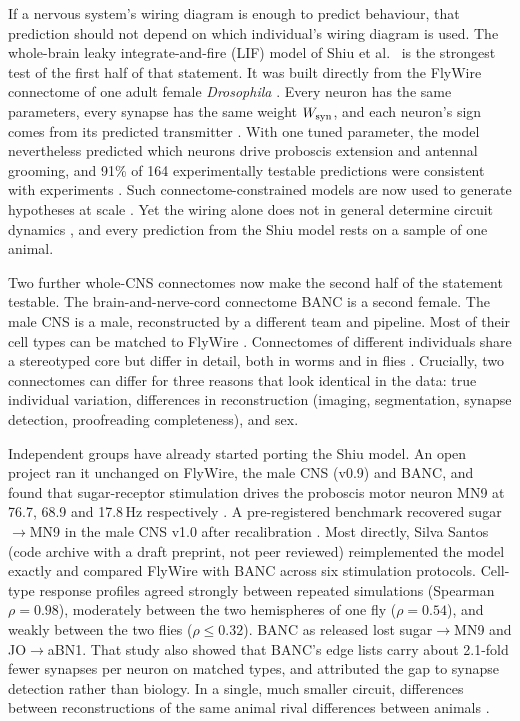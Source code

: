 If a nervous system's wiring diagram is enough to predict behaviour, that prediction should
not depend on which individual's wiring diagram is used. The whole-brain leaky
integrate-and-fire (LIF) model of Shiu et al.\ \citep{shiu2024} is the strongest test of the
first half of that statement. It was built directly from the FlyWire connectome of one adult
female \textit{Drosophila} \citep{dorkenwald2024,schlegel2024}. Every neuron has the same
parameters, every synapse has the same weight $W_{\mathrm{syn}}$, and each neuron's sign comes from its
predicted transmitter \citep{eckstein2024}. With one tuned parameter, the model nevertheless
predicted which neurons drive proboscis extension and antennal grooming, and 91\% of 164
experimentally testable predictions were consistent with experiments \citep{shiu2024}. Such
connectome-constrained models are now used to generate hypotheses at scale
\citep{pospisil2024,lappalainen2024}. Yet the wiring alone does not in general determine
circuit dynamics \citep{bargmann2013,beiran2025}, and every prediction from the Shiu model
rests on a sample of one animal.

Two further whole-CNS connectomes now make the second half of the statement testable. The
brain-and-nerve-cord connectome BANC \citep{bates2026} is a second female. The male CNS
\citep{berg2026} is a male, reconstructed by a different team and pipeline. Most of their
cell types can be matched to FlyWire \citep{schlegel2024,berg2026}. Connectomes of different
individuals share a stereotyped core but differ in detail, both in worms \citep{witvliet2021}
and in flies \citep{schlegel2024,pedigo2023}. Crucially, two connectomes can differ for three
reasons that look identical in the data: true individual variation, differences in
reconstruction (imaging, segmentation, synapse detection, proofreading completeness), and sex.

Independent groups have already started porting the Shiu model. An open project ran it
unchanged on FlyWire, the male CNS (v0.9) and BANC, and found that sugar-receptor stimulation
drives the proboscis motor neuron MN9 at 76.7, 68.9 and 17.8\,Hz respectively
\citep{brainlab2026}. A pre-registered benchmark recovered sugar$\to$MN9 in the male CNS v1.0
after recalibration \citep{fugsukjit2026}. Most directly, Silva Santos \citep{santos2026} (code archive with a draft preprint, not peer reviewed) reimplemented
the model exactly and compared FlyWire with BANC across six stimulation protocols. Cell-type
response profiles agreed strongly between repeated simulations (Spearman $\rho=0.98$),
moderately between the two hemispheres of one fly ($\rho=0.54$), and weakly between the two
flies ($\rho\le0.32$). BANC as released lost sugar$\to$MN9 and JO$\to$aBN1. That study also
showed that BANC's edge lists carry about 2.1-fold fewer synapses per neuron on matched types,
and attributed the gap to synapse detection rather than biology. In a single, much smaller
circuit, differences between reconstructions of the same animal rival differences between
animals \citep{yad2026}.

